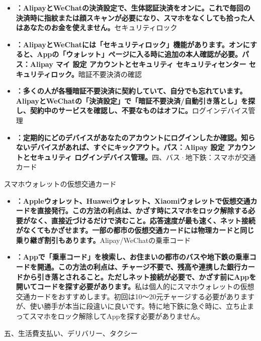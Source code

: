 \begin{itemize}
  \item \textbf{：AlipayとWeChatの決済設定で、生体認証決済をオンに。これで毎回の決済時に指紋または顔スキャンが必要になり、スマホをなくしても拾った人はあなたのお金を使えません。}セキュリティロック
  \item \textbf{：AlipayとWeChatには「セキュリティロック」機能があります。オンにすると、Appの「ウォレット」ページに入る時に追加の本人確認が必要。パス：Alipay マイ 設定 アカウントとセキュリティ セキュリティセンター セキュリティロック。}暗証不要決済の確認
  \item \textbf{：多くの人が各種暗証不要決済に契約していて、自分でも忘れています。AlipayとWeChatの「決済設定」で「暗証不要決済/自動引き落とし」を探し、契約中のサービスを確認し、不要なものはオフに。}ログインデバイス管理
  \item \textbf{：定期的にどのデバイスがあなたのアカウントにログインしたか確認。知らないデバイスがあれば、すぐにキックアウト。パス：Alipay 設定 アカウントとセキュリティ ログインデバイス管理。}四、バス·地下鉄：スマホが交通カード
\end{itemize}


スマホウォレットの仮想交通カード

\begin{itemize}
  \item \textbf{：Appleウォレット、Huaweiウォレット、Xiaomiウォレットで仮想交通カードを直接発行。この方法の利点は、かざす時にスマホをロック解除する必要がなく、直接近づけるだけで済むこと。応答速度が最も速く、ネット接続がなくてもかざせます。一部の都市の仮想交通カードには物理カードと同じ乗り継ぎ割引もあります。}Alipay/WeChatの乗車コード
  \item \textbf{：Appで「乗車コード」を検索し、お住まいの都市のバスや地下鉄の乗車コードを開通。この方法の利点は、チャージ不要で、残高や連携した銀行カードから引き落とされること。ただしネット接続が必要で、かざす前にAppを開いてコードを探す必要があります。}私は個人的にスマホウォレットの仮想交通カードをおすすめします。初回は10〜20元チャージする必要がありますが、使い勝手が本当に段違いに良いです。特に地下鉄に急ぐ時に、立ち止まってスマホをロック解除してAppを探す必要がありません。
\end{itemize}

五、生活費支払い、デリバリー、タクシー


